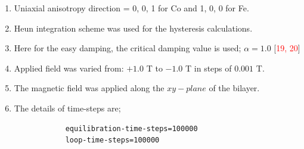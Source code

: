 \begin{enumerate}
\begin{enumerate} [\ding{212}]
        \item Uniaxial anisotropy direction = 0, 0, 1 for Co and 1, 0, 0 for Fe.
        \item Heun integration scheme was used for the hysteresis calculations.
        \item Here for the easy damping, the critical damping value is used; $\alpha=1.0$ [\textcolor{red}{19, 20}]
        \item Applied field was varied from: $+1.0$ T to $-1.0$ T in steps of $0.001$ T.
        \item The magnetic field was applied along the $xy-plane$ of the bilayer.
        \item The details of time-steps are;
        \begin{verbatim}
            equilibration-time-steps=100000
            loop-time-steps=100000
        \end{verbatim}   
    \end{enumerate}
\end{enumerate}


